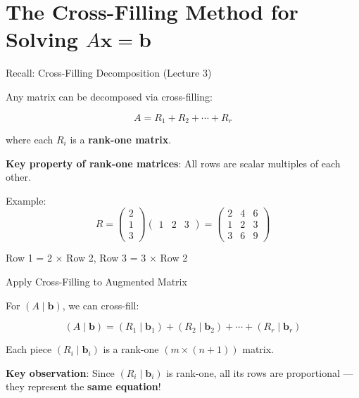 \documentclass[10pt]{beamer}
\theoremstyle{definition}
\newcommand{\x}[1]{\alert{\textbf{#1}}}
\begin{document}
\section{The Cross-Filling Method for Solving $A\mathbf{x} = \mathbf{b}$}

\begin{frame}{Recall: Cross-Filling Decomposition (Lecture 3)}

Any matrix can be decomposed via cross-filling:

$$A = R_1 + R_2 + \cdots + R_r$$

where each $R_i$ is a \x{rank-one matrix}.

\vspace{1em}

\x{Key property of rank-one matrices}: All rows are scalar multiples of each other.

\vspace{1em}

Example:
$$R = \begin{pmatrix} 2 \\ 1 \\ 3 \end{pmatrix} \begin{pmatrix} 1 & 2 & 3 \end{pmatrix} = \begin{pmatrix}
2 & 4 & 6 \\
1 & 2 & 3 \\
3 & 6 & 9
\end{pmatrix}$$

Row 1 = 2 × Row 2, Row 3 = 3 × Row 2

\end{frame}

\begin{frame}{Apply Cross-Filling to Augmented Matrix}

For $(A \mid \mathbf{b})$, we can cross-fill:

$$(A \mid \mathbf{b}) = (R_1 \mid \mathbf{b}_1) + (R_2 \mid \mathbf{b}_2) + \cdots + (R_r \mid \mathbf{b}_r)$$

\vspace{1em}

Each piece $(R_i \mid \mathbf{b}_i)$ is a rank-one $(m \times (n+1))$ matrix.

\vspace{1em}

\x{Key observation}: Since $(R_i \mid \mathbf{b}_i)$ is rank-one, all its rows are proportional — they represent the \x{same equation}!

\end{frame}
\end{document}
